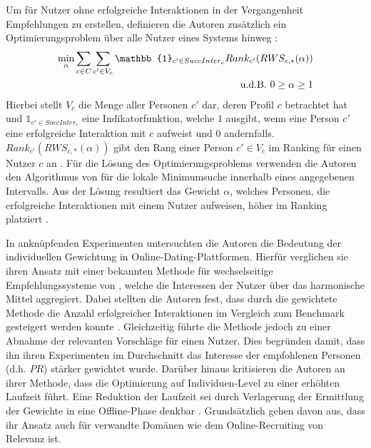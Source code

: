 Um für Nutzer ohne erfolgreiche Interaktionen in der Vergangenheit Empfehlungen zu erstellen, definieren die Autoren zusätzlich ein Optimierungsproblem über alle Nutzer eines Systems hinweg \cite[S. 135]{kleinerman:2:inproceedings}:
\begin{equation}\label{eq37}
    \begin{aligned}
        \min_{\alpha} \sum_{c \in C} \sum_{c' \in V_{c}} \mathbb{1}_{c' \in SuccInter_{c}} Rank_{c'} (RWS_{c,*}(\alpha))\\
        \textnormal{u.d.B. } 0 \geq \alpha \geq 1\\
    \end{aligned}
\end{equation}
Hierbei stellt $V_{c}$ die Menge aller Personen $c'$ dar, deren Profil $c$ betrachtet hat und $\mathbb{1}_{c' \in SuccInter_{c}}$ eine Indikatorfunktion, welche $1$ ausgibt, wenn eine Person $c'$ eine erfolgreiche Interaktion mit $c$ aufweist und $0$ andernfalls.
$Rank_{c'} (RWS_{c,*}(\alpha))$ gibt den Rang einer Person $c' \in V_{c}$ im Ranking für einen Nutzer $c$ an \cite[S. 135]{kleinerman:2:inproceedings}.
Für die Lösung des Optimierungsproblems verwenden die Autoren den Algorithmus von \textcite[S. 422ff.]{brent:article} für die lokale Minimumsuche innerhalb eines angegebenen Intervalls.
Aus der Lösung resultiert das Gewicht $\alpha$, welches Personen, die erfolgreiche Interaktionen mit einem Nutzer aufweisen, höher im Ranking platziert \cite[S. 135]{kleinerman:2:inproceedings}.

In anknüpfenden Experimenten untersuchten die Autoren die Bedeutung der individuellen Gewichtung in Online-Dating-Plattformen.
Hierfür verglichen sie ihren Ansatz mit einer bekannten Methode für wechselseitige Empfehlungssysteme von \textcite[S. 6]{xia:inproceedings}, welche die Interessen der Nutzer über das harmonische Mittel aggregiert.
Dabei stellten die Autoren fest, dass durch die gewichtete Methode die Anzahl erfolgreicher Interaktionen im Vergleich zum Benchmark gesteigert werden konnte \cite[S. 132]{kleinerman:2:inproceedings}.
Gleichzeitig führte die Methode jedoch zu einer Abnahme der relevanten Vorschläge für einen Nutzer.
Dies begründen \textcite[S. 132]{kleinerman:2:inproceedings} damit, dass ihn ihren Experimenten im Durchschnitt das Interesse der empfohlenen Personen (d.h. $PR$) stärker gewichtet wurde.
Darüber hinaus kritisieren die Autoren an ihrer Methode, dass die Optimierung auf Individuen-Level zu einer erhöhten Laufzeit führt.
Eine Reduktion der Laufzeit sei durch Verlagerung der Ermittlung der Gewichte in eine Offline-Phase denkbar \cite[S. 138]{kleinerman:2:inproceedings}.
Grundsätzlich gehen  \textcite[S. 138]{kleinerman:2:inproceedings} davon aus, dass ihr Ansatz auch für verwandte Domänen wie dem Online-Recruiting von Relevanz ist.

